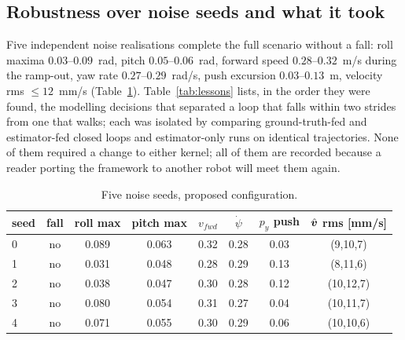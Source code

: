 \documentclass[11pt]{article}
\begin{document}
\subsection{Robustness over noise seeds and what it took}
Five independent noise realisations complete the full scenario without a fall: roll maxima $0.03$--$0.09$~rad, pitch $0.05$--$0.06$~rad, forward speed $0.28$--$0.32$~m/s during the ramp-out, yaw rate $0.27$--$0.29$~rad/s, push excursion $0.03$--$0.13$~m, velocity rms $\le12$~mm/s (Table~\ref{tab:seeds}). Table~\ref{tab:lessons} lists, in the order they were found, the modelling decisions that separated a loop that falls within two strides from one that walks; each was isolated by comparing ground-truth-fed and estimator-fed closed loops and estimator-only runs on identical trajectories. None of them required a change to either kernel; all of them are recorded because a reader porting the framework to another robot will meet them again.

\begin{table}[t]\centering\caption{Five noise seeds, proposed configuration.}\label{tab:seeds}
\scriptsize\begin{tabular}{@{}lccccccc@{}}\toprule
seed & fall & roll max & pitch max & $v_{fwd}$ & $\dot\psi$ & $p_y$ push & $\hat{\bm{v}}$ rms [mm/s]\\\midrule
0 & no & 0.089 & 0.063 & 0.32 & 0.28 & 0.03 & (9,10,7)\\
1 & no & 0.031 & 0.048 & 0.28 & 0.29 & 0.13 & (8,11,6)\\
2 & no & 0.038 & 0.047 & 0.30 & 0.28 & 0.12 & (10,12,7)\\
3 & no & 0.080 & 0.054 & 0.31 & 0.27 & 0.04 & (10,11,7)\\
4 & no & 0.071 & 0.055 & 0.30 & 0.29 & 0.06 & (10,10,6)\\
\bottomrule\end{tabular}\end{table}
\end{document}
